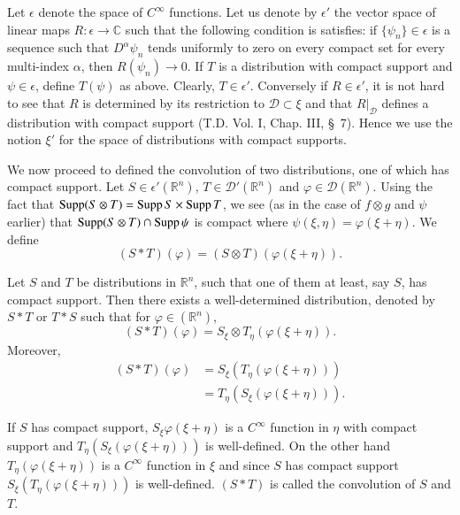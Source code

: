 \begin{remark*}
Let $\epsilon$ denote the space of $C^{\infty}$ functions. Let us
denote by $\epsilon'$ the vector space of linear maps $R:\epsilon\to
\mathbb{C}$ such that the following condition is satisfies: if
$\{\psi_{n}\}\in \epsilon$ is a sequence such that
$D^{\alpha}\psi_{n}$ tends uniformly to zero on every compact set for
every multi-index $\alpha$, then $R(\psi_{n})\to 0$. If $T$ is a
distribution with compact support and $\psi\in \epsilon$, define\pageoriginale
$T(\psi)$ as above. Clearly, $T\in \epsilon'$. Conversely if $R\in
\epsilon'$, it is not hard to see that $R$ is determined by its
restriction to $\mathcal{D}\subset \xi$ and that $R|_{\mathcal{D}}$
defines a distribution with compact support (T.D. Vol. I, Chap. III,
\S\ 7). Hence we use the notion $\xi'$ for the space of distributions
with compact supports.
\end{remark*}

We now proceed to defined the convolution of two distributions, one of
which has compact support. Let $S\in \epsilon'(\mathbb{R}^{n})$, $T\in
\mathcal{D}'(\mathbb{R}^{n})$ and $\varphi\in
\mathcal{D}(\mathbb{R}^{n})$. Using the fact that $\operatorname{Supp} (S\otimes
T)=\operatorname{Supp} S\times \operatorname{Supp} T$, we see (as in the case of $f\otimes g$ and
$\psi$ earlier) that $\operatorname{Supp} (S\otimes T)\cap \operatorname{Supp} \psi$ is compact
where $\psi(\xi,\eta)=\varphi(\xi+\eta)$. We define
$$
(S\ast T)(\varphi)=(S\otimes T)(\varphi(\xi+\eta)).
$$

\begin{theorem}\label{chap3-thm5}
Let $S$ and $T$ be distributions in $\mathbb{R}^{n}$, such that one of
them at least, say $S$, has compact support. Then there exists a
well-determined distribution, denoted by $S\ast T$ or $T\ast S$ such
that for $\varphi\in (\mathbb{R}^{n})$,
$$
(S\ast T)(\varphi)=S_{\xi}\otimes T_{\eta}(\varphi(\xi+\eta)).
$$
Moreover,
\begin{align*}
(S\ast T)(\varphi) &= S_{\xi}(T_{\eta}(\varphi(\xi+\eta)))\\[3pt]
&= T_{\eta}(S_{\xi}(\varphi(\xi+\eta))).
\end{align*}
\end{theorem}

If $S$ has compact support, $S_{\xi}\varphi(\xi+\eta)$ is a
$C^{\infty}$ function in $\eta$ with compact support and
$T_{\eta}(S_{\xi}(\varphi(\xi+\eta)))$ is well-defined. On the other
hand $T_{\eta}(\varphi(\xi+\eta))$ is a $C^{\infty}$ function in $\xi$
and since $S$ has compact support
$S_{\xi}(T_{\eta}(\varphi(\xi+\eta)))$ is well-defined. $(S\ast T)$ is
called the convolution of $S$ and $T$.

